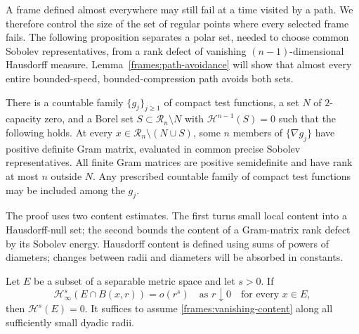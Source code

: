 A frame defined almost everywhere may still fail at a time visited by
a path.  We therefore control the size of the set of regular points
where every selected frame fails.  The following proposition separates
a polar set, needed to choose common Sobolev representatives, from a
rank defect of vanishing $(n-1)$-dimensional Hausdorff measure.
Lemma~\ref{frames:path-avoidance} will show that almost every entire
bounded-speed, bounded-compression path avoids both sets.

\begin{proposition}
 \label{frames:countable-frames}
 There is a countable family $\{g_j\}_{j\geq1}$ of compact test
 functions, a set $N$ of $2$-capacity zero, and a Borel set
 $S\subset\mathcal R_n\setminus N$ with
 $\mathcal H^{n-1}(S)=0$ such that the following holds.
 At every $x\in\mathcal R_n\setminus(N\cup S)$, some $n$ members of
 $\{\nabla g_j\}$ have positive definite Gram matrix, evaluated in
 common precise Sobolev representatives.
 All finite Gram matrices are positive semidefinite and have rank
 at most $n$ outside $N$.
 Any prescribed countable family of compact test functions may be
 included among the $g_j$.
\end{proposition}

The proof uses two content estimates.  The first turns small local
content into a Hausdorff-null set; the second bounds the content of a
Gram-matrix rank defect by its Sobolev energy.  Hausdorff content is
defined using sums of powers of diameters; changes between radii and
diameters will be absorbed in constants.

\begin{lemma}\label{frames:content-null}
 Let $E$ be a subset of a separable metric space and let $s>0$.  If
 \begin{equation}\label{frames:vanishing-content}
  \mathcal H^s_\infty(E\cap B(x,r))=o(r^s)
  \quad\text{as }r\downarrow0\quad\text{for every }x\in E,
 \end{equation}
 then $\mathcal H^s(E)=0$.  It suffices to assume
 \eqref{frames:vanishing-content} along all sufficiently small dyadic
 radii.
\end{lemma}

